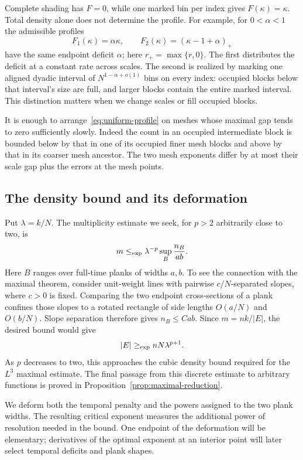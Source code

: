 Complete shading has $F=0$, while one marked bin per index gives
$F(\kappa)=\kappa$. Total density alone does not determine the profile.
For example, for $0<\alpha<1$ the admissible profiles
\[
 F_1(\kappa)=\alpha\kappa,
 \qquad F_2(\kappa)=(\kappa-1+\alpha)_+
\]
have the same endpoint deficit $\alpha$; here $r_+=\max\{r,0\}$.
The first distributes the deficit
at a constant rate across scales. The second is realized by marking one
aligned dyadic interval of $N^{1-\alpha+o(1)}$ bins on every index:
occupied blocks below that interval's size are full, and larger blocks
contain the entire marked interval. This distinction matters when we
change scales or fill occupied blocks.

It is enough to arrange~\eqref{eq:uniform-profile} on meshes whose maximal
gap tends to zero sufficiently slowly.  Indeed the count in an occupied
intermediate block is bounded below by that in one of its occupied finer
mesh blocks and above by that in its coarser mesh ancestor.  The two mesh
exponents differ by at most their scale gap plus the errors at the mesh
points.

\subsection{The density bound and its deformation}

Put $\lambda=k/N$. The multiplicity estimate we seek, for $p>2$
arbitrarily close to two, is
\begin{equation}\label{eq:undeformed-density-target}
 m\mathrel{\leq_{\mathrm{exp}}} \lambda^{-p}\sup_B\frac{n_B}{ab}.
\end{equation}
Here $B$ ranges over full-time planks of widths $a,b$. To see the
connection with the maximal theorem, consider unit-weight lines with
pairwise $c/N$-separated slopes, where $c>0$ is fixed. Comparing the two
endpoint cross-sections of a plank confines those slopes to a rotated
rectangle of side lengths $O(a/N)$ and $O(b/N)$. Slope separation therefore
gives $n_B\le C ab$. Since $m=nk/|E|$, the desired bound would give
\[
 |E|\mathrel{\geq_{\mathrm{exp}}} nN\lambda^{p+1}.
\]
As $p$ decreases to two, this approaches the cubic density bound required
for the $L^3$ maximal estimate. The final passage from this discrete
estimate to arbitrary functions is proved in
Proposition~\ref{prop:maximal-reduction}.

We deform both the temporal penalty and the powers assigned to the two
plank widths. The resulting critical exponent measures the additional
power of resolution needed in the bound. One endpoint of the deformation
will be elementary; derivatives of the optimal exponent at an interior
point will later select temporal deficits and plank shapes.

